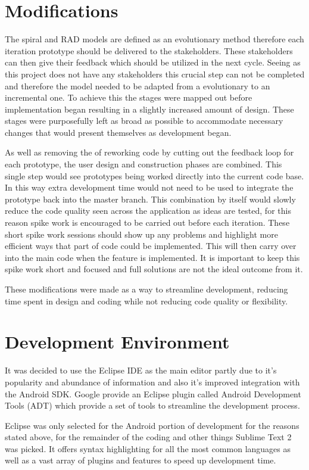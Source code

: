 \section{Modifications}
The spiral and RAD models are defined as an evolutionary method therefore each iteration prototype should be delivered to the stakeholders. These stakeholders can then give their feedback which should be utilized in the next cycle. Seeing as this project does not have any stakeholders this crucial step can not be completed and therefore the model needed to be adapted from a evolutionary to an incremental one. To achieve this the stages were mapped out before implementation began resulting in a slightly increased amount of design. These stages were purposefully left as broad as possible to accommodate necessary changes that would present themselves as development began.

As well as removing the of reworking code by cutting out the feedback loop for each prototype, the user design and construction phases are combined. This single step would see prototypes being worked directly into the current code base. In this way extra development time would not need to be used to integrate the prototype back into the master branch. This combination by itself would slowly reduce the code quality seen across the application as ideas are tested, for this reason spike work is encouraged to be carried out before each iteration. These short spike work sessions should show up any problems and highlight more efficient ways that part of code could be implemented. This will then carry over into the main code when the feature is implemented. It is important to keep this spike work short and focused and full solutions are not the ideal outcome from it.

These modifications were made as a way to streamline development, reducing time spent in design and coding while not reducing code quality or flexibility.


\section{Development Environment}
It was decided to use the Eclipse IDE as the main editor partly due to it's popularity and abundance of information and also it's improved integration with the Android SDK. Google provide an Eclipse plugin called Android Development Tools (ADT) which provide a set of tools to streamline the development process. 

Eclipse was only selected for the Android portion of development for the reasons stated above, for the remainder of the coding and other things Sublime Text 2 was picked. It offers syntax highlighting for all the most common languages as well as a vast array of plugins and features to speed up development time.

